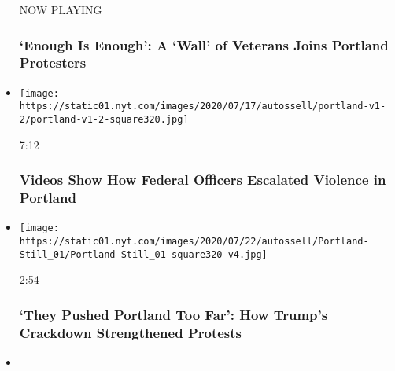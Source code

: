 \begin{itemize}
  NOW PLAYING

  \hypertarget{enough-is-enough-a-wall-of-veterans-joins-portland-protesters-2}{%
  \subsubsection{`Enough Is Enough': A `Wall' of Veterans Joins Portland
  Protesters}\label{enough-is-enough-a-wall-of-veterans-joins-portland-protesters-2}}
\item
  \href{https://www.nytimes.com/video/us/100000007243995/portland-protests-federal-government.html?action=click\&module=video-series-bar\&region=header\&pgtype=Article\&playlistId=video/minneapolis-george-floyd-death-video}{}

  \texttt{[image: https://static01.nyt.com/images/2020/07/17/autossell/portland-v1-2/portland-v1-2-square320.jpg]}

  7:12

  \hypertarget{videos-show-how-federal-officers-escalated-violence-in-portland}{%
  \subsubsection{Videos Show How Federal Officers Escalated Violence in
  Portland}\label{videos-show-how-federal-officers-escalated-violence-in-portland}}
\item
  \href{https://www.nytimes.com/video/us/100000007250985/they-pushed-portland-too-far-trump-crackdown-strengthens-protests.html?action=click\&module=video-series-bar\&region=header\&pgtype=Article\&playlistId=video/minneapolis-george-floyd-death-video}{}

  \texttt{[image: https://static01.nyt.com/images/2020/07/22/autossell/Portland-Still\_01/Portland-Still\_01-square320-v4.jpg]}

  2:54

  \hypertarget{they-pushed-portland-too-far-how-trumps-crackdown-strengthened-protests}{%
  \subsubsection{`They Pushed Portland Too Far': How Trump's Crackdown
  Strengthened
  Protests}\label{they-pushed-portland-too-far-how-trumps-crackdown-strengthened-protests}}
\item
  \href{https://www.nytimes.com/video/us/politics/100000007251035/portland-unrest-protests.html?action=click\&module=video-series-bar\&region=header\&pgtype=Article\&playlistId=video/minneapolis-george-floyd-death-video}{}


\end{itemize}
